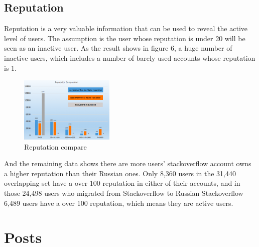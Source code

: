 \documentclass[A4paper,twoside,twocolumn]{article}
\begin{document}
\subsection{Reputation}
Reputation is a very valuable information that can be used to reveal the active level of users. The assumption is the user whose reputation is under 20 will be seen as an inactive user. As the result shows in figure 6, a huge number of inactive users, which includes a number of barely used accounts whose reputation is 1. 
	\begin{figure}[H]
		\includegraphics[width = 0.4\textwidth]{user3.png}
		\caption{Reputation compare}
  	\end{figure}
And the remaining data shows there are more users' stackoverflow account owns a higher reputation than their Russian ones. Only 8,360 users in the 31,440 overlapping set have a over 100 reputation in either of their accounts, and in those 24,498 users who migrated from Stackoverflow to Russian Stackoverflow 6,489 users have a over 100 reputation, which means they are active users. 

\section{Posts}
\end{document}
